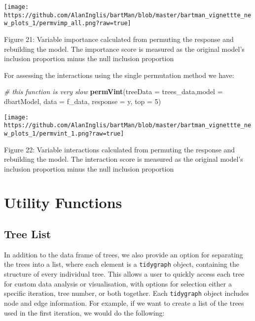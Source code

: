 \documentclass[
]{article}
\newenvironment{Shaded}{\begin{snugshade}}{\end{snugshade}}
\newcommand{\AttributeTok}[1]{\textcolor[rgb]{0.13,0.29,0.53}{#1}}
\newcommand{\CommentTok}[1]{\textcolor[rgb]{0.56,0.35,0.01}{\textit{#1}}}
\newcommand{\DecValTok}[1]{\textcolor[rgb]{0.00,0.00,0.81}{#1}}
\newcommand{\FunctionTok}[1]{\textcolor[rgb]{0.13,0.29,0.53}{\textbf{#1}}}
\newcommand{\NormalTok}[1]{#1}
\newcommand{\StringTok}[1]{\textcolor[rgb]{0.31,0.60,0.02}{#1}}
\begin{document}
\begin{center}\texttt{[image: https://github.com/AlanInglis/bartMan/blob/master/bartman\_vignettte\_new\_plots\_1/permvimp\_all.png?raw=true]} \end{center}

\protect\hypertarget{fig21:fig21}{}{Figure 21: } Variable importance
calculated from permuting the response and rebuilding the model. The
importance score is measured as the original model's inclusion
proportion minus the null inclusion proportion

For assessing the interactions using the single permutation method we
have:

\begin{Shaded}
\begin{Highlighting}[]
\CommentTok{\# this function is very slow}
\FunctionTok{permVint}\NormalTok{(}\AttributeTok{treeData =}\NormalTok{ trees\_data,}\AttributeTok{model =}\NormalTok{ dbartModel, }\AttributeTok{data =}\NormalTok{ f\_data, }\AttributeTok{response =} \StringTok{\textquotesingle{}y\textquotesingle{}}\NormalTok{, }\AttributeTok{top =} \DecValTok{5}\NormalTok{)}
\end{Highlighting}
\end{Shaded}

\begin{center}\texttt{[image: https://github.com/AlanInglis/bartMan/blob/master/bartman\_vignettte\_new\_plots\_1/permvint\_1.png?raw=true]} \end{center}

\protect\hypertarget{fig22:fig22}{}{Figure 22: } Variable interactions
calculated from permuting the response and rebuilding the model. The
interaction score is measured as the original model's inclusion
proportion minus the null inclusion proportion

\hypertarget{utility-functions}{%
\section{Utility Functions}\label{utility-functions}}

\hypertarget{tree-list}{%
\subsection{Tree List}\label{tree-list}}

In addition to the data frame of trees, we also provide an option for
separating the trees into a list, where each element is a
\texttt{tidygraph} object, containing the structure of every individual
tree. This allows a user to quickly access each tree for custom data
analysis or visualisation, with options for selection either a specific
iteration, tree number, or both together. Each \texttt{tidygraph} object
includes node and edge information. For example, if we want to create a
list of the trees used in the first iteration, we would do the
following:
\end{document}
